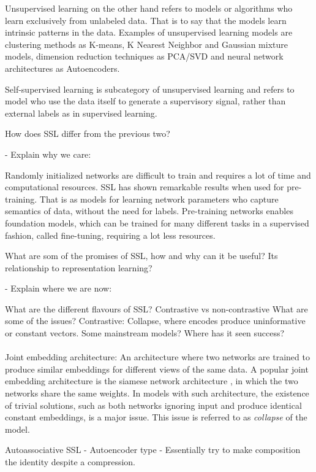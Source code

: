 \documentclass[../../thesis.tex]{subfiles}
\begin{document}
Unsupervised learning on the other hand refers to models or algorithms who learn exclusively from unlabeled data. That is to say that the models learn intrinsic patterns in the data. Examples of unsupervised learning models are clustering methods as K-means, K Nearest Neighbor and Gaussian mixture models, dimension reduction techniques as PCA/SVD and neural network architectures as Autoencoders. 


Self-supervised learning is subcategory of unsupervised learning and refers to model who use the data itself to generate a supervisory signal, rather than external labels as in supervised learning. 

How does SSL differ from the previous two?

- Explain why we care:

Randomly initialized networks are difficult to train and requires a lot of time and computational resources. SSL has shown remarkable results when used for pre-training. That is as models for learning network parameters who capture semantics of data, without the need for labels. Pre-training networks enables foundation models, which can be trained for many different tasks in a supervised fashion, called fine-tuning, requiring a lot less resources.  



What are som of the promises of SSL, how and why can it be useful?
Its relationship to representation learning?

- Explain where we are now:

What are the different flavours of SSL? Contrastive vs non-contrastive
What are some of the issues? 
Contrastive: Collapse, where encodes produce uninformative or constant vectors.
Some mainstream models? 
Where has it seen success?\\\\

Joint embedding architecture: An architecture where two networks are trained to produce similar embeddings for different views of the same data. A popular joint embedding architecture is the siamese network architecture \cite{siamese}, in which the two networks share the same weights. In models with such architecture, the existence of trivial solutions, such as both networks ignoring input and produce identical constant embeddings, is a major issue. This issue is referred to as \textit{collapse} of the model.


Autoassociative SSL - Autoencoder type - Essentially try to make composition the identity despite a compression. 
\end{document}
